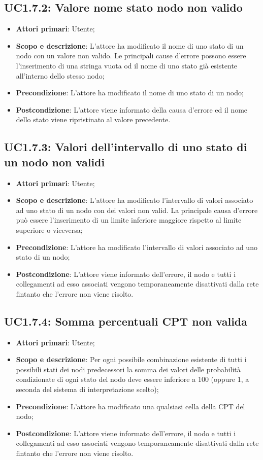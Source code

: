 \subsection{UC1.7.2: Valore nome stato nodo non valido} 
\begin{itemize} 
	\item{\textbf{Attori primari}: Utente;} 
	\item{\textbf{Scopo e descrizione}: L'attore ha modificato il nome di uno stato di un nodo con un valore non valido. Le principali cause d'errore possono essere l'inserimento di una stringa vuota od il nome di uno stato già esistente all'interno dello stesso nodo;} 
	\item{\textbf{Precondizione}: L'attore ha modificato il nome di uno stato di un nodo;} 
	\item{\textbf{Postcondizione}: L'attore viene informato della causa d'errore ed il nome dello stato viene ripristinato al valore precedente.} 
\end{itemize} 
\subsection{UC1.7.3: Valori dell'intervallo di uno stato di un nodo non validi} 
\begin{itemize} 
	\item{\textbf{Attori primari}: Utente;} 
	\item{\textbf{Scopo e descrizione}: L'attore ha modificato l'intervallo di valori associato ad uno stato di un nodo con dei valori non valid. La principale causa d'errore può essere l'inserimento di un limite inferiore maggiore rispetto al limite superiore o viceversa;} 
	\item{\textbf{Precondizione}: L'attore ha modificato l'intervallo di valori associato ad uno stato di un nodo;} 
	\item{\textbf{Postcondizione}: L'attore viene informato dell'errore, il nodo e tutti i collegamenti ad esso associati vengono temporaneamente disattivati dalla rete fintanto che l'errore non viene risolto.} 
\end{itemize} 
\subsection{UC1.7.4: Somma percentuali CPT non valida} 
\begin{itemize} 
	\item{\textbf{Attori primari}: Utente;} 
	\item{\textbf{Scopo e descrizione}: Per ogni possibile combinazione esistente di tutti i possibili stati dei nodi predecessori la somma dei valori delle probabilità condizionate di ogni stato del nodo deve essere inferiore a 100 (oppure 1, a seconda del sistema di interpretazione scelto);} 
	\item{\textbf{Precondizione}: L'attore ha modificato una qualsiasi cella della CPT del nodo;} 
	\item{\textbf{Postcondizione}: L'attore viene informato dell'errore, il nodo e tutti i collegamenti ad esso associati vengono temporaneamente disattivati dalla rete fintanto che l'errore non viene risolto.}
\end{itemize} 
